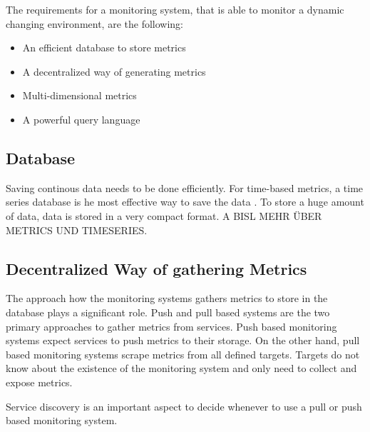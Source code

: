 The requirements for a monitoring system, that is able to monitor a dynamic changing environment, are the following:
\begin{itemize}
\item An efficient database to store metrics
\item A decentralized way of generating metrics \cite{Farcic2017Toolkit21} %
\item Multi-dimensional metrics \cite{Farcic2017Toolkit21}
\item A powerful query language \cite{Farcic2017Toolkit21}
\end{itemize}


\subsection{Database}
Saving continous data needs to be done efficiently. 
For time-based metrics, a time series database is he most effective way to save the data \cite{Farcic2017Toolkit21}. To store a huge amount of data, data is stored in a very compact format.
A BISL MEHR ÜBER METRICS UND TIMESERIES.


\subsection{Decentralized Way of gathering Metrics}
The approach how the monitoring systems gathers metrics to store in the database plays a significant role.
Push and pull based systems are the two primary approaches to gather metrics from services.
Push based monitoring systems expect services to push metrics to their storage.
On the other hand, pull based monitoring systems scrape metrics from all defined targets. Targets do not know about the existence of the monitoring system and only need to collect and expose metrics.


Service discovery is an important aspect to decide whenever to use a pull or push based monitoring system.

